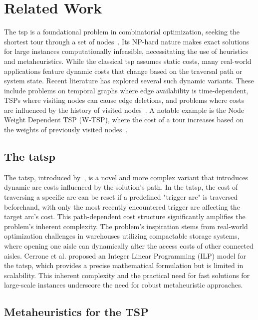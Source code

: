 \documentclass[twocolumn, switch]{article} %
\begin{document}
\section{Related Work}
\label{sec:related_work}

The \gls{tsp} is a foundational problem in combinatorial optimization, seeking the shortest tour through a set of nodes~\cite{Reinelt2003}. 
Its NP-hard nature makes exact solutions for large instances computationally infeasible, necessitating the use of heuristics and metaheuristics.
While the classical \gls{tsp} assumes static costs, many real-world applications feature dynamic costs that change based on the traversal path or system state.
Recent literature has explored several such dynamic variants. These include problems on temporal graphs where edge availability is time-dependent, TSPs where visiting nodes can cause edge deletions, and problems where costs are influenced by the history of visited nodes~\cite{Cerrone}. A notable example is the Node Weight Dependent TSP (W-TSP), where the cost of a tour increases based on the weights of previously visited nodes~\cite{Bossek2020}.

\subsection{The \gls{tatsp}}

The \gls{tatsp}, introduced by~\citet{Cerrone}, is a novel and more complex variant that introduces dynamic arc costs influenced by the solution's path. 
In the \gls{tatsp}, the cost of traversing a specific arc can be reset if a predefined "trigger arc" is traversed beforehand, with only the most recently encountered trigger arc affecting the target arc's cost.
This path-dependent cost structure significantly amplifies the problem's inherent complexity. The problem's inspiration stems from real-world optimization challenges in warehouses utilizing compactable storage systems, where opening one aisle can dynamically alter the access costs of other connected aisles.
Cerrone et al. proposed an Integer Linear Programming (ILP) model for the \gls{tatsp}, which provides a precise mathematical formulation but is limited in scalability. This inherent complexity and the practical need for fast solutions for large-scale instances underscore the need for robust metaheuristic approaches.

\subsection{Metaheuristics for the TSP}
\label{sec:metaheuristics_tsp}
\end{document}
